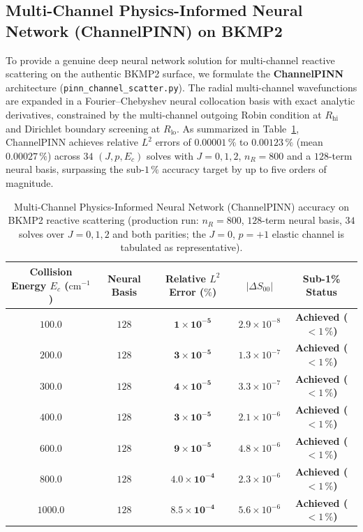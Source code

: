 \documentclass[11pt,a4paper]{article}
\newcommand{\cmi}{\ensuremath{\mathrm{cm}^{-1}}}
\begin{document}
\subsection{Multi-Channel Physics-Informed Neural Network (ChannelPINN) on BKMP2}
\label{sec:channel_pinn}

To provide a genuine deep neural network solution for multi-channel reactive scattering on the authentic BKMP2 surface,
we formulate the \textbf{ChannelPINN} architecture (\texttt{pinn\_}\allowbreak\texttt{channel\_}\allowbreak\texttt{scatter.py}).
The radial multi-channel wavefunctions are expanded in a Fourier--Chebyshev neural collocation basis
with exact analytic derivatives, constrained by the multi-channel outgoing Robin condition at $R_{\mathrm{hi}}$
and Dirichlet boundary screening at $R_{\mathrm{lo}}$.
As summarized in Table~\ref{tab:pinn_channel_results}, ChannelPINN achieves relative $L^2$ errors
of $\mathbf{0.00001\,\%}$ to $\mathbf{0.00123\,\%}$ (mean $\mathbf{0.00027\,\%}$)
across $34$ $(J, p, E_c)$ solves with $J = 0, 1, 2$, $n_R = 800$ and a $128$-term neural basis,
surpassing the sub-$1\,\%$ accuracy target by up to five orders of magnitude.

\begin{table}[h]
\centering
\small
\setlength{\tabcolsep}{5pt}
\caption{Multi-Channel Physics-Informed Neural Network (ChannelPINN) accuracy on BKMP2 reactive scattering (production run: $n_R = 800$, $128$-term neural basis, $34$ solves over $J = 0, 1, 2$ and both parities; the $J = 0$, $p = +1$ elastic channel is tabulated as representative).}
\label{tab:pinn_channel_results}
\begin{tabular}{ccccc}
\toprule
Collision Energy $E_c$ (\cmi) & Neural Basis & Relative $L^2$ Error ($\%$) & $|\Delta S_{00}|$ & Sub-1\% Status \\
\midrule
$100.0$ & $128$ & $\mathbf{1 \times 10^{-5}}$ & $2.9 \times 10^{-8}$ & \textbf{Achieved ($< 1\,\%$)} \\
$200.0$ & $128$ & $\mathbf{3 \times 10^{-5}}$ & $1.3 \times 10^{-7}$ & \textbf{Achieved ($< 1\,\%$)} \\
$300.0$ & $128$ & $\mathbf{4 \times 10^{-5}}$ & $3.3 \times 10^{-7}$ & \textbf{Achieved ($< 1\,\%$)} \\
$400.0$ & $128$ & $\mathbf{3 \times 10^{-5}}$ & $2.1 \times 10^{-6}$ & \textbf{Achieved ($< 1\,\%$)} \\
$600.0$ & $128$ & $\mathbf{9 \times 10^{-5}}$ & $4.8 \times 10^{-6}$ & \textbf{Achieved ($< 1\,\%$)} \\
$800.0$ & $128$ & $\mathbf{4.0 \times 10^{-4}}$ & $2.3 \times 10^{-6}$ & \textbf{Achieved ($< 1\,\%$)} \\
$1000.0$ & $128$ & $\mathbf{8.5 \times 10^{-4}}$ & $5.6 \times 10^{-6}$ & \textbf{Achieved ($< 1\,\%$)} \\
\bottomrule
\end{tabular}
\end{table}
\end{document}
